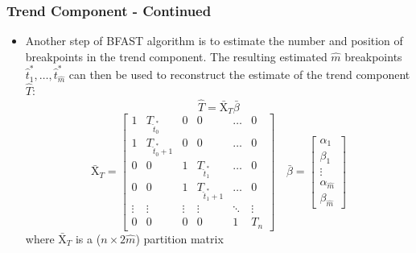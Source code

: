 \documentclass[presentation.tex]{subfiles}
\begin{document}
\begin{frame}
  \frametitle{Trend Component - Continued}
  \begin{itemize}
  \item Another step of BFAST algorithm is to estimate the number and position
    of breakpoints in the trend component. The resulting estimated $\hat{m}$ breakpoints
    $\hat{t}_1^*,\hdots, \hat{t}_{\hat{m}}^*$ can then be used to reconstruct
    the estimate of the trend component $\hat{T}$:
    \[
    \hat{T} = \bar{\mathrm{X}}_T \bar{\beta}
    \]
    \medspace
    \[
    \mathrm{\bar{X}}_T = 
    \begin{bmatrix}
      1 & T_{\hat{t}_0^*} & 0 & 0 & \hdots & 0 \\
      1 & T_{\hat{t}_0^*+1} & 0 & 0 & \hdots & 0 \\
      0 & 0 & 1 & T_{\hat{t}_1^*} & \hdots & 0 \\
      0 & 0 & 1 & T_{\hat{t}_1^*+1} &\hdots & 0 \\
      \vdots & \vdots & \vdots & \vdots & \ddots & \vdots \\
      0 & 0 & 0 & 0 & 1 & T_{n}
    \end{bmatrix}
    \quad
    \bar{\beta} = 
    \begin{bmatrix}
      \alpha_1 \\
      \beta_1 \\
      \vdots \\
      \alpha_{\hat{m}} \\
      \beta_{\hat{m}} 
    \end{bmatrix}
    \]
    where $\bar{\mathrm{X}}_T$ is a ($n \times 2\hat{m}$) partition matrix
  \end{itemize} 
\end{frame}
\end{document}
